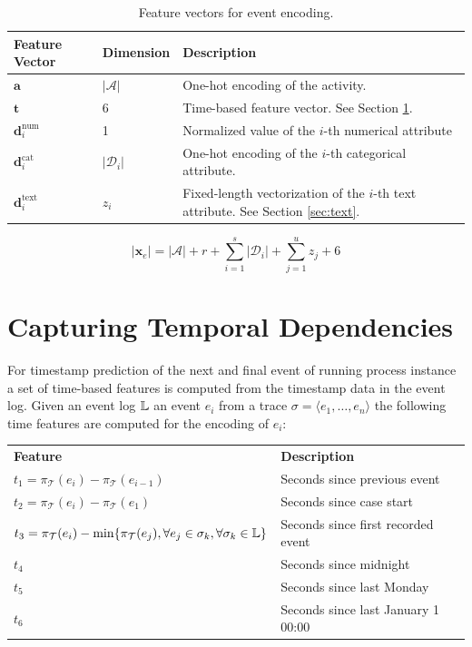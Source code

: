 \begin{table}


\begin{tabularx}{\textwidth}{l l p{10cm} }
	\toprule
	 \textbf{Feature Vector} &  \textbf{Dimension} &  \textbf{Description} \\
	 \midrule
	 	$\bm{a}$ & $|\mathcal{A}|$& One-hot encoding of the activity. \\
	 	$\bm{t}$ & 6 & Time-based feature vector. See Section \ref{sec:time}.\\
	 	$\bm{d}_i^\mathrm{num}$ & 1 & Normalized value of the $i$-th numerical attribute\\
	 	$\bm{d}_i^\mathrm{cat}$ &$|\mathcal{D}_i|$ & One-hot encoding of the $i$-th categorical attribute.\\
	 	$\bm{d}_i^\mathrm{text}$ & $z_i$& Fixed-length vectorization of the $i$-th text attribute. \newline See Section \ref{sec:text}.\\
	\bottomrule
	 
\end{tabularx}
	\caption{Feature vectors for event encoding.}
	\label{tab:features}
\end{table}

\begin{equation}
	|\bm{x}_e|= |\mathcal{A}| + r + \sum_{i=1}^{s} |\mathcal{D}_i| + \sum_{j=1}^{u} z_j + 6
\end{equation}


\section{Capturing Temporal Dependencies}\label{sec:time}


For timestamp prediction of the next and final event of running process instance a set of time-based features is computed from the timestamp data in the event log.
Given an event log $\mathbb{L}$ an event $e_i$ from a trace $\sigma = \langle e_1, \dots, e_n \rangle$ the following time features are computed for the encoding of $e_i$: 

\begin{center}
\begin{tabularx}{\textwidth}{l l}
	\centering
	 \textbf{Feature} & \textbf{Description} \\
	$t_1 = \pi_\mathcal{T}(e_i) - \pi_\mathcal{T}(e_{i-1})$ & Seconds since previous event \\
	$t_2 = \pi_\mathcal{T}(e_i) - \pi_\mathcal{T}(e_1)$ & Seconds since case start \\
	$t_3 = \pi_\mathcal{T}(e_i) - \min\{\pi_\mathcal{T}(e_{j}), \forall e_j \in \sigma_k, \forall  \sigma_k \in \mathbb{L}\}$ & Seconds since first recorded event \\
	$t_4$ & Seconds since midnight \\
	$t_5$ & Seconds since last Monday \\
	$t_6$ & Seconds since last January 1 00:00
\end{tabularx}
\end{center}

